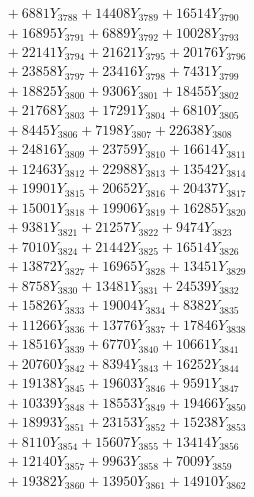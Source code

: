 \documentclass[a4paper,10pt]{article}
\begin{document}
{\begin{align}
&\;  + 6881 Y_{3788} + 14408 Y_{3789} + 16514 Y_{3790} \\[0.3ex]
&\;  + 16895 Y_{3791} + 6889 Y_{3792} + 10028 Y_{3793} \\[0.3ex]
&\;  + 22141 Y_{3794} + 21621 Y_{3795} + 20176 Y_{3796} \\[0.3ex]
&\;  + 23858 Y_{3797} + 23416 Y_{3798} + 7431 Y_{3799} \\[0.3ex]
&\;  + 18825 Y_{3800} + 9306 Y_{3801} + 18455 Y_{3802} \\[0.3ex]
&\;  + 21768 Y_{3803} + 17291 Y_{3804} + 6810 Y_{3805} \\[0.3ex]
&\;  + 8445 Y_{3806} + 7198 Y_{3807} + 22638 Y_{3808} \\[0.5ex]\allowbreak
&\;  + 24816 Y_{3809} + 23759 Y_{3810} + 16614 Y_{3811} \\[0.3ex]
&\;  + 12463 Y_{3812} + 22988 Y_{3813} + 13542 Y_{3814} \\[0.3ex]
&\;  + 19901 Y_{3815} + 20652 Y_{3816} + 20437 Y_{3817} \\[0.3ex]
&\;  + 15001 Y_{3818} + 19906 Y_{3819} + 16285 Y_{3820} \\[0.3ex]
&\;  + 9381 Y_{3821} + 21257 Y_{3822} + 9474 Y_{3823} \\[0.3ex]
&\;  + 7010 Y_{3824} + 21442 Y_{3825} + 16514 Y_{3826} \\[0.3ex]
&\;  + 13872 Y_{3827} + 16965 Y_{3828} + 13451 Y_{3829} \\[0.3ex]
&\;  + 8758 Y_{3830} + 13481 Y_{3831} + 24539 Y_{3832} \\[0.3ex]
&\;  + 15826 Y_{3833} + 19004 Y_{3834} + 8382 Y_{3835} \\[0.3ex]
&\;  + 11266 Y_{3836} + 13776 Y_{3837} + 17846 Y_{3838} \\[0.5ex]\allowbreak
&\;  + 18516 Y_{3839} + 6770 Y_{3840} + 10661 Y_{3841} \\[0.3ex]
&\;  + 20760 Y_{3842} + 8394 Y_{3843} + 16252 Y_{3844} \\[0.3ex]
&\;  + 19138 Y_{3845} + 19603 Y_{3846} + 9591 Y_{3847} \\[0.3ex]
&\;  + 10339 Y_{3848} + 18553 Y_{3849} + 19466 Y_{3850} \\[0.3ex]
&\;  + 18993 Y_{3851} + 23153 Y_{3852} + 15238 Y_{3853} \\[0.3ex]
&\;  + 8110 Y_{3854} + 15607 Y_{3855} + 13414 Y_{3856} \\[0.3ex]
&\;  + 12140 Y_{3857} + 9963 Y_{3858} + 7009 Y_{3859} \\[0.3ex]
&\;  + 19382 Y_{3860} + 13950 Y_{3861} + 14910 Y_{3862} \\[0.3ex]

\end{align}}
\end{document}
